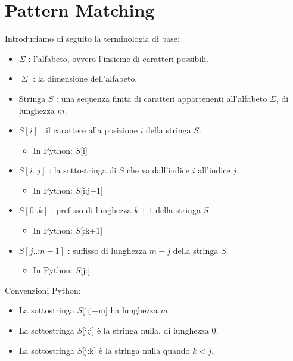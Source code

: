 \chapter{Pattern Matching}
\label{cap:PatternMatching}



Introduciamo di seguito la terminologia di base:
\begin{itemize}
    \item \(\Sigma\) : l'alfabeto, ovvero l'insieme di caratteri possibili.
    \item \(|\Sigma|\) : la dimensione dell'alfabeto.
    \item Stringa \( S \) : una sequenza finita di caratteri appartenenti all'alfabeto \(\Sigma\), di lunghezza \( m \).
    \item \(S[i]\) : il carattere alla posizione \( i \) della stringa \( S \).
        \begin{itemize}[nosep]
            \item In Python: $S$[i] 
        \end{itemize}
    \item \(S[i..j]\) : la sottostringa di \( S \) che va dall'indice \( i \) all'indice \( j \).
        \begin{itemize}[nosep]
            \item In Python: $S$[i:j+1] 
        \end{itemize}
    \item \(S[0..k]\) : prefisso di lunghezza \( k+1 \) della stringa \( S \).
        \begin{itemize}[nosep]
            \item In Python: $S$[:k+1]
        \end{itemize}
    \item \(S[j..m-1]\) : suffisso di lunghezza \( m-j \) della stringa \( S \). 
        \begin{itemize}[nosep]
            \item In Python: $S$[j:]
        \end{itemize}
\end{itemize}

\noindent
Convenzioni Python: 
\begin{itemize}[nosep]
    \item La sottostringa $S$[j:j+m] ha lunghezza $m$.
    \item La sottostringa $S$[j:j] è la stringa nulla, di lunghezza 0.
    \item La sottostringa $S$[j:k] è la stringa nulla quando $k < j$.
\end{itemize}


